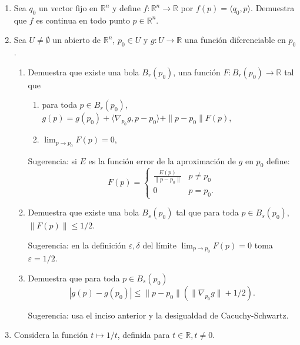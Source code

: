 \documentclass{article}
\theoremstyle{definition}
\begin{document}
\begin{enumerate}
  
          \item Sea $q_0$ un vector fijo en $\mathbb{R}^n$ y define $f:\mathbb{R}^n \to \mathbb{R}$
            por $f(p)=\langle q_0, p \rangle$. Demuestra que $f$ es continua en todo punto $p \in \mathbb{R}^n$.
           \item\label{Ejer:AproxLinealReglaCadena} 
            Sea $U\ne \emptyset$ un abierto de $\mathbb{R}^n$, $p_0\in U $ y $g:U \to \mathbb{R}$
            una funci\'on diferenciable en $p_0$.
            \begin{enumerate}
            \item Demuestra que existe una bola $B_r(p_0)$, una funci\'on
              $F:B_{r}(p_0) \to \mathbb{R}$ tal que
              \begin{enumerate}
              \item para toda $p\in B_r(p_0)$, $g(p)=g(p_0)+\langle \nabla_{p_0}g, p-p_0\rangle +\|p-p_0\|F(p)$,
              \item $\lim_{p\to p_0}F(p)=0$,
              \end{enumerate}
              Sugerencia: si $E$ es la funci\'on error de la aproximaci\'on de $g$ en $p_0$ define:
              $$
              F(p)=\left\{
                \begin{array}{cc}
                  \frac{E(p)}{\|p-p_0\|} & p\ne p_0 \\
                  0 & p=p_0.
                \end{array}
              \right.
              $$

            \item Demuestra que existe una bola $B_s(p_0)$ tal que para toda $p\in B_s(p_0)$,
              $\|F(p)\|\leq 1/2$.

              Sugerencia: en la definici\'on $\varepsilon,\delta$ del l\'imite $\lim_{p\to p_0}F(p)=0$
              toma $\varepsilon =1/2$.
              
            \item Demuestra que  para toda $p\in B_s(p_0)$
              $$
              |g(p)-g(p_0)|\leq \|p-p_0\| (\|\nabla_{p_0}g\|+1/2).
              $$

              Sugerencia: usa el inciso anterior y la desigualdad de Cacuchy-Schwartz.
              
            \end{enumerate}

            \item  Considera la funci\'on  $t\mapsto 1/t$, definida para $t\in \mathbb{R}, t\ne 0$.


\end{enumerate}
\end{document}
